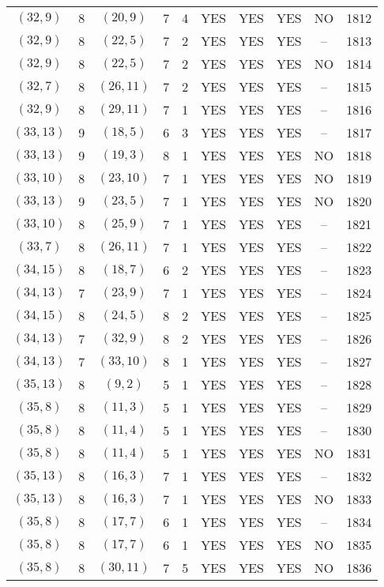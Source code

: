 \begin{longtable}{|c|c|c|c|c|c|c|c|c|c|}
$(32, 9)$ & 8 & $(20, 9)$ & 7 & 4 & YES & YES & YES & NO & 1812\\
$(32, 9)$ & 8 & $(22, 5)$ & 7 & 2 & YES & YES & YES & -- & 1813\\
$(32, 9)$ & 8 & $(22, 5)$ & 7 & 2 & YES & YES & YES & NO & 1814\\
$(32, 7)$ & 8 & $(26, 11)$ & 7 & 2 & YES & YES & YES & -- & 1815\\
$(32, 9)$ & 8 & $(29, 11)$ & 7 & 1 & YES & YES & YES & -- & 1816\\
$(33, 13)$ & 9 & $(18, 5)$ & 6 & 3 & YES & YES & YES & -- & 1817\\
$(33, 13)$ & 9 & $(19, 3)$ & 8 & 1 & YES & YES & YES & NO & 1818\\
$(33, 10)$ & 8 & $(23, 10)$ & 7 & 1 & YES & YES & YES & NO & 1819\\
$(33, 13)$ & 9 & $(23, 5)$ & 7 & 1 & YES & YES & YES & NO & 1820\\
$(33, 10)$ & 8 & $(25, 9)$ & 7 & 1 & YES & YES & YES & -- & 1821\\
$(33, 7)$ & 8 & $(26, 11)$ & 7 & 1 & YES & YES & YES & -- & 1822\\
$(34, 15)$ & 8 & $(18, 7)$ & 6 & 2 & YES & YES & YES & -- & 1823\\
$(34, 13)$ & 7 & $(23, 9)$ & 7 & 1 & YES & YES & YES & -- & 1824\\
$(34, 15)$ & 8 & $(24, 5)$ & 8 & 2 & YES & YES & YES & -- & 1825\\
$(34, 13)$ & 7 & $(32, 9)$ & 8 & 2 & YES & YES & YES & -- & 1826\\
$(34, 13)$ & 7 & $(33, 10)$ & 8 & 1 & YES & YES & YES & -- & 1827\\
$(35, 13)$ & 8 & $(9, 2)$ & 5 & 1 & YES & YES & YES & -- & 1828\\
$(35, 8)$ & 8 & $(11, 3)$ & 5 & 1 & YES & YES & YES & -- & 1829\\
$(35, 8)$ & 8 & $(11, 4)$ & 5 & 1 & YES & YES & YES & -- & 1830\\
$(35, 8)$ & 8 & $(11, 4)$ & 5 & 1 & YES & YES & YES & NO & 1831\\
$(35, 13)$ & 8 & $(16, 3)$ & 7 & 1 & YES & YES & YES & -- & 1832\\
$(35, 13)$ & 8 & $(16, 3)$ & 7 & 1 & YES & YES & YES & NO & 1833\\
$(35, 8)$ & 8 & $(17, 7)$ & 6 & 1 & YES & YES & YES & -- & 1834\\
$(35, 8)$ & 8 & $(17, 7)$ & 6 & 1 & YES & YES & YES & NO & 1835\\
$(35, 8)$ & 8 & $(30, 11)$ & 7 & 5 & YES & YES & YES & NO & 1836\\

\end{longtable}
